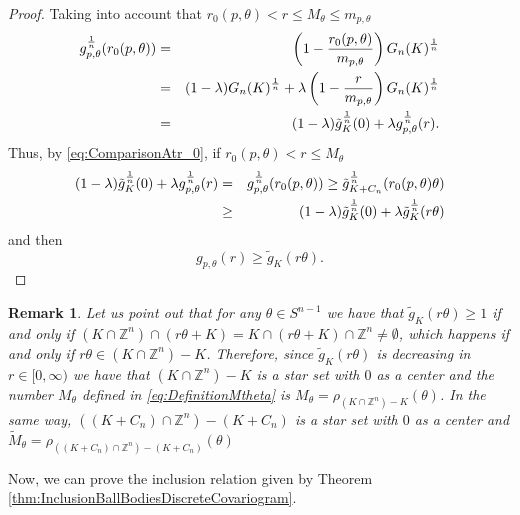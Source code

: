 \documentclass[10pt]{amsart}
\newtheorem{rmk}[thm]{Remark}
\def\Z{\mathbb{Z}}
\numberwithin{equation}{section}
\begin{document}
\begin{proof}
Taking into account that $r_0(p,\theta)<r\leq M_\theta\leq m_{p,\theta}$
\begin{eqnarray*}
g_{p,\theta}^\frac{1}{n}(r_0(p,\theta))&=&\left(1-\frac{r_0(p,\theta)}{m_{p,\theta}}\right)G_n(K)^\frac{1}{n}\cr
&=&(1-\lambda)G_n(K)^\frac{1}{n}+\lambda\left(1-\frac{r}{m_{p,\theta}}\right)G_n(K)^\frac{1}{n}\cr
&=&(1-\lambda)\tilde{g}_K^\frac{1}{n}(0)+\lambda g_{p,\theta}^\frac{1}{n}(r).
\end{eqnarray*}
Thus, by \eqref{eq:ComparisonAtr_0}, if $r_0(p,\theta)<r\leq M_\theta$
\begin{eqnarray*}
(1-\lambda)\tilde{g}_K^\frac{1}{n}(0)+\lambda g_{p,\theta}^\frac{1}{n}(r)&=&g_{p,\theta}^\frac{1}{n}(r_0(p,\theta))\geq\tilde{g}_{K+C_n}^\frac{1}{n}(r_0(p,\theta)\theta)\cr
&\geq&(1-\lambda)\tilde{g}_K^\frac{1}{n}(0)+\lambda \tilde{g}_K^\frac{1}{n}(r\theta)
\end{eqnarray*}
and then
$$
 g_{p,\theta}(r)\geq \tilde{g}_K(r\theta).
$$
\end{proof}

\begin{rmk}\label{rmk:RadialFunctionKcapZn-K}
Let us point out that for any $\theta\in S^{n-1}$ we have that $\tilde{g}_{K}(r\theta)\geq 1$ if and only if $(K\cap\Z^n)\cap(r\theta+K)=K\cap(r\theta+K)\cap\Z^n\neq\emptyset$, which happens if and only if $r\theta\in (K\cap\Z^n)-K$. Therefore, since $\tilde{g}_{K}(r\theta)$ is decreasing in $r\in[0,\infty)$ we have that $(K\cap \Z^n)-K$ is a star set with $0$ as a center and the number $M_\theta$ defined in \eqref{eq:DefinitionMtheta} is $M_\theta=\rho_{(K\cap \Z^n)-K}(\theta)$. In the same way, $((K+C_n)\cap \Z^n)-(K+C_n)$ is a star set with $0$ as a center and $\tilde{M}_\theta=\rho_{((K+C_n)\cap \Z^n)-(K+C_n)}(\theta)$
\end{rmk}
Now, we can prove the inclusion relation given by Theorem \ref{thm:InclusionBallBodiesDiscreteCovariogram}.
\end{document}
